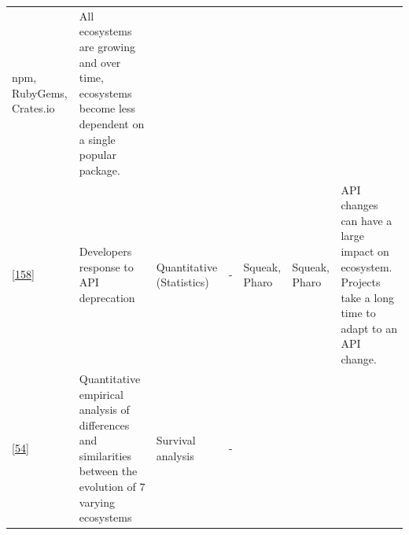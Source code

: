 \documentclass[]{book}
\begin{document}
\begin{longtable}[]{@{}lllllll@{}}
\begin{minipage}[t]{0.12\columnwidth}
npm, RubyGems, Crates.io\strut
\end{minipage} & \begin{minipage}[t]{0.10\columnwidth}\raggedright\strut
All ecosystems are growing and over time, ecosystems become less
dependent on a single popular package.\strut
\end{minipage}\tabularnewline
\begin{minipage}[t]{0.09\columnwidth}\raggedright\strut
{[}\protect\hyperlink{ref-Robbes2012}{158}{]}\strut
\end{minipage} & \begin{minipage}[t]{0.16\columnwidth}\raggedright\strut
Developers response to API deprecation\strut
\end{minipage} & \begin{minipage}[t]{0.17\columnwidth}\raggedright\strut
Quantitative (Statistics)\strut
\end{minipage} & \begin{minipage}[t]{0.07\columnwidth}\raggedright\strut
-\strut
\end{minipage} & \begin{minipage}[t]{0.10\columnwidth}\raggedright\strut
Squeak, Pharo\strut
\end{minipage} & \begin{minipage}[t]{0.12\columnwidth}\raggedright\strut
Squeak, Pharo\strut
\end{minipage} & \begin{minipage}[t]{0.10\columnwidth}\raggedright\strut
API changes can have a large impact on ecosystem. Projects take a long
time to adapt to an API change.\strut
\end{minipage}\tabularnewline
\begin{minipage}[t]{0.09\columnwidth}\raggedright\strut
{[}\protect\hyperlink{ref-Decan2018}{54}{]}\strut
\end{minipage} & \begin{minipage}[t]{0.16\columnwidth}\raggedright\strut
Quantitative empirical analysis of differences and similarities between
the evolution of 7 varying ecosystems\strut
\end{minipage} & \begin{minipage}[t]{0.17\columnwidth}\raggedright\strut
Survival analysis\strut
\end{minipage} & \begin{minipage}[t]{0.07\columnwidth}\raggedright\strut
-\strut
\end{minipage} & \begin{minipage}[t]{0.10\columnwidth}\raggedright\strut

\end{minipage}
\end{longtable}
\end{document}
